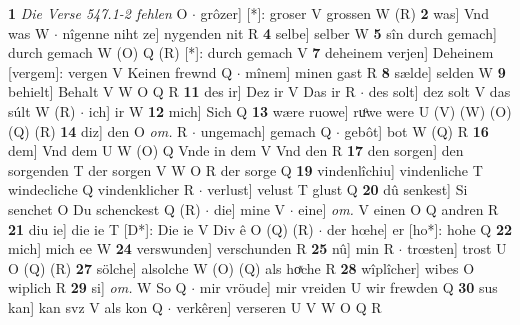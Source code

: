 \documentclass[8pt,a4paper,notitlepage]{article}
\begin{document}
\begin{table}[ht]
\begin{minipage}[t]{0.5\linewidth}
\textbf{1} \textit{Die Verse 547.1-2 fehlen} O   $\cdot$ grôzer] [*]: groser V grossen W (R) \textbf{2} was] Vnd was W  $\cdot$ nîgenne niht ze] nygenden nit R \textbf{4} selbe] selber W \textbf{5} sîn durch gemach] durch gemach W (O) Q (R) [*]: durch gemach  V \textbf{7} deheinem verjen] Deheinem [vergem]: vergen V Keinen frewnd Q  $\cdot$ mînem] minen gast R \textbf{8} sælde] selden W \textbf{9} behielt] Behalt V W O Q R \textbf{11} des ir] Dez ir V Das ir R  $\cdot$ des solt] dez solt V das súlt W (R)  $\cdot$ ich] ir W \textbf{12} mich] Sich Q \textbf{13} wære ruowe] ruͦwe were U (V) (W) (O) (Q) (R) \textbf{14} diz] den O \textit{om.} R  $\cdot$ ungemach] gemach Q  $\cdot$ gebôt] bot W (Q) R \textbf{16} dem] Vnd dem U W (O) Q Vnde in dem V Vnd den R \textbf{17} den sorgen] den sorgenden T der sorgen V W O R der sorge Q \textbf{19} vindenlîchiu] vindenliche T windecliche Q vindenklicher R  $\cdot$ verlust] velust T glust Q \textbf{20} dû senkest] Si senchet O Du schenckest Q (R)  $\cdot$ die] mine V  $\cdot$ eine] \textit{om.} V einen O Q andren R \textbf{21} diu ie] die ie T [D*]: Die ie V Div ê O (Q) (R)  $\cdot$ der hœhe] er [ho*]: hohe Q \textbf{22} mich] mich ee W \textbf{24} verswunden] verschunden R \textbf{25} nû] min R  $\cdot$ trœsten] trost U O (Q) (R) \textbf{27} sölche] alsolche W (O) (Q) als hoͯche R \textbf{28} wîplîcher] wibes O wiplich R \textbf{29} si] \textit{om.} W So Q  $\cdot$ mir vröude] mir vreiden U wir frewden Q \textbf{30} sus kan] kan svz V als kon Q  $\cdot$ verkêren] verseren U V W O Q R \newline
\end{minipage}
\end{table}
\end{document}
